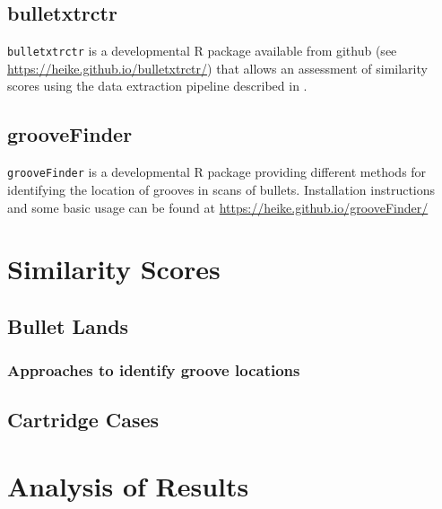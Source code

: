 \documentclass[]{book}
\begin{document}
\hypertarget{bulletxtrctr}{%
\subsection{bulletxtrctr}\label{bulletxtrctr}}

\texttt{bulletxtrctr} is a developmental R package available from github (see \url{https://heike.github.io/bulletxtrctr/}) that allows an assessment of similarity scores using the data extraction pipeline described in \citet{aoas}.

\hypertarget{groovefinder}{%
\subsection{grooveFinder}\label{groovefinder}}

\texttt{grooveFinder} is a developmental R package providing different methods for identifying the location of grooves in scans of bullets.
Installation instructions and some basic usage can be found at \url{https://heike.github.io/grooveFinder/}

\hypertarget{similarity-scores}{%
\section{Similarity Scores}\label{similarity-scores}}

\hypertarget{bullet-lands}{%
\subsection{Bullet Lands}\label{bullet-lands}}

\hypertarget{approaches-to-identify-groove-locations}{%
\subsubsection{Approaches to identify groove locations}\label{approaches-to-identify-groove-locations}}

\hypertarget{cartridge-cases}{%
\subsection{Cartridge Cases}\label{cartridge-cases}}

\hypertarget{analysis-of-results}{%
\section{Analysis of Results}\label{analysis-of-results}}
\end{document}
